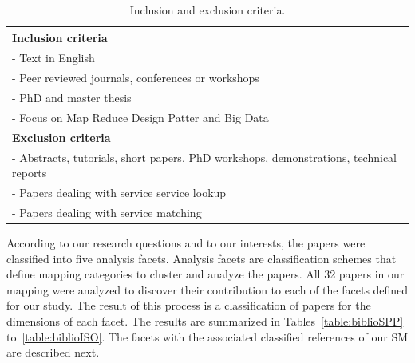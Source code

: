 \begin{table}\centering \small
\begin{tabular}{|l|} \hline
\textbf{Inclusion criteria}		\\ \hline\hline
- Text in English								\\ \hline
- Peer reviewed journals, conferences or workshops	\\ \hline
- PhD and master thesis	\\ \hline
- Focus on Map Reduce Design Patter and Big Data				\\ \hline\hline
\textbf{Exclusion criteria}		\\ \hline\hline	
- Abstracts, tutorials, short papers, PhD workshops, demonstrations, technical reports		\\ \hline	
- Papers dealing with service service lookup		\\ \hline
- Papers dealing with service matching 	\\ \hline
\end{tabular}
\caption{\label{table:criteria} Inclusion and exclusion criteria.}
\end{table}


According to our research questions and to our interests, the papers were classified into five analysis facets. 
Analysis facets are classification schemes  that define mapping categories to cluster and analyze the papers. 
All 32 papers in our mapping were analyzed to discover their contribution to
each of the facets defined for our study.
The result of this process is a classification of papers for the dimensions of each facet.
The results are summarized in Tables~\ref{table:biblioSPP} to~\ref{table:biblioISO}.
The facets with the associated classified references of our SM are described next. 

